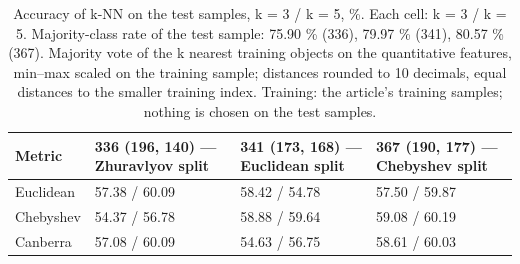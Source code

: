 \begin{table}[htbp]
  \centering
  \caption{Accuracy of k-NN on the test samples, k = 3 / k = 5, \%. Each cell: k = 3 / k = 5. Majority-class rate of the test sample: 75.90 \% (336), 79.97 \% (341), 80.57 \% (367). Majority vote of the k nearest training objects on the quantitative features, min--max scaled on the training sample; distances rounded to 10 decimals, equal distances to the smaller training index. Training: the article's training samples; nothing is chosen on the test samples.}
  \label{tab:table-8}
  \begin{tabular}{llll}
    \toprule
    Metric & 336 (196, 140) --- Zhuravlyov split & 341 (173, 168) --- Euclidean split & 367 (190, 177) --- Chebyshev split \\
    \midrule
    Euclidean & 57.38 / 60.09 & 58.42 / 54.78 & 57.50 / 59.87 \\
    Chebyshev & 54.37 / 56.78 & 58.88 / 59.64 & 59.08 / 60.19 \\
    Canberra & 57.08 / 60.09 & 54.63 / 56.75 & 58.61 / 60.03 \\
    \bottomrule
  \end{tabular}
\end{table}
